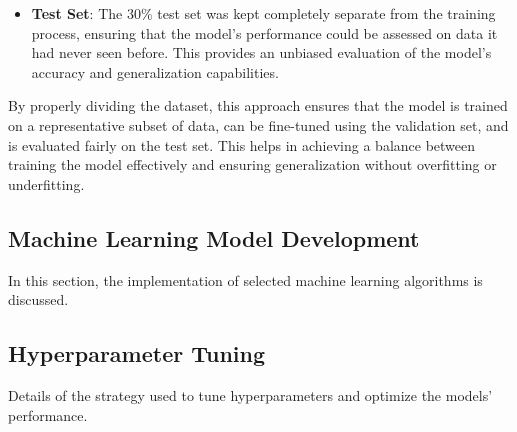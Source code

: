 \begin{itemize}
    \item \textbf{Test Set}: The 30\% test set was kept completely separate from the training process, ensuring that the model's performance could be assessed on data it had never seen before. This provides an unbiased evaluation of the model's accuracy and generalization capabilities.
\end{itemize}

By properly dividing the dataset, this approach ensures that the model is trained on a representative subset of data, can be fine-tuned using the validation set, and is evaluated fairly on the test set. 
This helps in achieving a balance between training the model effectively and ensuring generalization without overfitting or underfitting.

\subsection{Machine Learning Model Development}
In this section, the implementation of selected machine learning algorithms is discussed.

\subsection{Hyperparameter Tuning}
Details of the strategy used to tune hyperparameters and optimize the models' performance.
